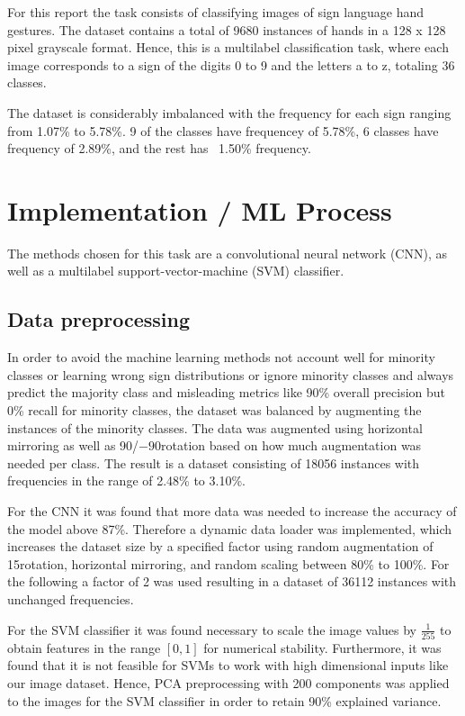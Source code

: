 \documentclass[a4, 10 pt, conference]{ieeeconf}  %
\begin{document}
For this report the task consists of classifying images of sign language hand gestures.
The dataset contains a total of 9680 instances of hands in a 128 x 128 pixel grayscale format.
Hence, this is a multilabel classification task, where each image corresponds to a
sign of the digits 0 to 9 and the letters a to z, totaling 36 classes.

The dataset is considerably imbalanced with the frequency for each sign ranging from
1.07\% to 5.78\%. 9 of the classes have frequencey of 5.78\%, 6 classes have
frequency of 2.89\%, and the rest has ~1.50\% frequency.

\section{Implementation / ML Process}
\label{sec:methods}

The methods chosen for this task are a convolutional neural network (CNN), as
well as a multilabel support-vector-machine (SVM) classifier.

\subsection{Data preprocessing}
\label{subsec:preprocessing}

In order to avoid the machine learning methods not account well for minority classes or
learning wrong sign distributions or ignore minority classes and always predict the majority class
and misleading metrics like 90\% overall precision but 0\% recall for minority classes,
the dataset was balanced by augmenting the instances of the minority classes.
The data was augmented using horizontal mirroring as well as 90\textdegree/$-90$\textdegree rotation based
on how much augmentation was needed per class. The result is a dataset consisting
of 18056 instances with frequencies in the range of 2.48\% to 3.10\%.

For the CNN it was found that more data was needed to increase the accuracy of the model
above 87\%. Therefore a dynamic data loader was implemented, which increases the
dataset size by a specified factor using random augmentation of 15\textdegree rotation,
horizontal mirroring, and random scaling between 80\% to 100\%. For the following
a factor of 2 was used resulting in a dataset of 36112 instances with unchanged frequencies.

For the SVM classifier it was found necessary to scale the image values by $\frac{1}{255}$
to obtain features in the range $[0,1]$ for numerical stability. Furthermore, it was found that it is not feasible for SVMs to work with high dimensional inputs
like our image dataset. Hence, PCA preprocessing with 200 components was applied to the images for the
SVM classifier in order to retain 90\% explained variance.
\end{document}
